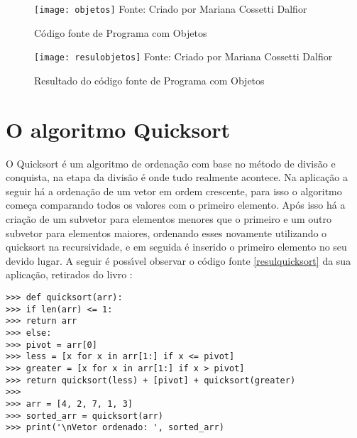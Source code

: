 \begin{figure}[H]
  	\begin{center}
  		\caption{C\'{o}digo fonte de Programa com Objetos} \label{objetos}
  		\texttt{[image: objetos]} 
  		\newline
  		Fonte: Criado por Mariana Cossetti Dalfior
  	\end{center}
\end{figure}

\begin{figure}[H]
  	\begin{center}
  		\caption{Resultado do c\'{o}digo fonte de Programa com Objetos} \label{resulobjetos}
  		\texttt{[image: resulobjetos]} 
  		\newline
  		Fonte: Criado por Mariana Cossetti Dalfior
  	\end{center}
\end{figure}
    

    \section{O algoritmo Quicksort}
O Quicksort \'{e} um algoritmo de ordena\c{c}\~{a}o com base no m\'{e}todo de divis\~{a}o e conquista, na etapa da divis\~{a}o \'{e} onde tudo realmente acontece. Na aplica\c{c}\~{a}o a seguir h\'{a} a ordena\c{c}\~{a}o de um vetor em ordem crescente, para isso o algoritmo come\c{c}a comparando todos os valores com o primeiro elemento. Ap\'{o}s isso h\'{a} a cria\c{c}\~{a}o de um subvetor para elementos menores que o primeiro e um outro subvetor para elementos maiores, ordenando esses novamente utilizando o quicksort na recursividade, e em seguida \'{e} inserido o primeiro elemento no seu devido lugar. A seguir \'{e} poss\'{\i}vel observar o c\'{o}digo fonte \ref{resulquicksort} da sua aplica\c{c}\~{a}o, retirados do livro \cite{Ramalho2022}: 

\begin{lstlisting}
>>> def quicksort(arr):
>>> if len(arr) <= 1:
>>> return arr
>>> else:
>>> pivot = arr[0]
>>> less = [x for x in arr[1:] if x <= pivot]
>>> greater = [x for x in arr[1:] if x > pivot]
>>> return quicksort(less) + [pivot] + quicksort(greater)
>>> 
>>> arr = [4, 2, 7, 1, 3]
>>> sorted_arr = quicksort(arr)
>>> print('\nVetor ordenado: ', sorted_arr)
\end{lstlisting}

